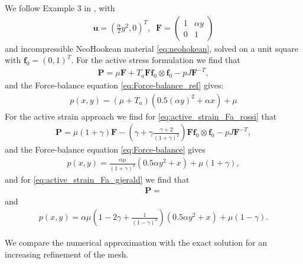 \documentclass[a4paper,10pt]{article}
\newcommand{\uvec}{\mathbf{u}}
\newcommand{\ef}{\mathbf{f}_0}
\newcommand{\F}{\mathbf{F}}
\newcommand{\FPiola}{\mathbf{P}}
\begin{document}
We follow Example 3 in \cite{rossi2012orthotropic}, with
\begin{align}
\uvec  = \left(\frac{\alpha}{2}y^2, 0\right)^T, \;\; \F = \begin{pmatrix} 1 & \alpha y \\ 0 & 1\end{pmatrix}
\end{align}
and incompressible NeoHookean material \eqref{eq:neohokean}, solved on a unit square with $\ef = (0,1)^T$.
For the active stress formulation we find that
\begin{align}
\FPiola = \mu \F + T_a \F  \ef \otimes \ef - pJ\F^{-T}, 
\end{align}
and the Force-balance equation \eqref{eq:Force-balance_ref} gives:
\begin{align}
  p(x,y) = (\mu + T_a)(0.5 ( \alpha y)^2 + \alpha x) + \mu
\end{align}
For the active strain approach we find for \eqref{eq:active_strain_Fa_rossi} that
\begin{align}
\FPiola = \mu(1+\gamma) \F  - \left( \gamma +\gamma \frac{\gamma + 2}{(1+\gamma)^2} \right) \F\ef \otimes \ef - pJ\F^{-T}, 
\end{align}
and the Force-balance equation \eqref{eq:Force-balance} gives
\begin{align}
  p(x,y) = \frac{\alpha \mu}{(1+\gamma)^2}(0.5 \alpha y^2 +  x) + \mu(1+\gamma),
\end{align}
and for \eqref{eq:active_strain_Fa_gjerald} we find that
\begin{align}
\FPiola =
\end{align}
and 
\begin{align}
  p(x,y) = \alpha \mu \left(1 - 2\gamma + \frac{1}{(1-\gamma)^2}\right)(0.5  \alpha y^2 +  x) + \mu(1-\gamma).
\end{align}

We compare the numerical approximation with the exact solution for an increasing refinement of the mesh.
\end{document}
